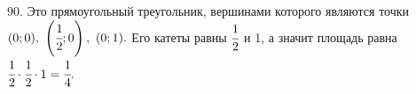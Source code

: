 90. Это прямоугольный треугольник, вершинами которого являются точки $(0;0),\ \left(\cfrac{1}{2};0\right),\ (0;1).$ Его катеты равны $\cfrac{1}{2}$ и 1, а значит площадь равна $\cfrac{1}{2}\cdot\cfrac{1}{2}\cdot1=\cfrac{1}{4}.$\\
